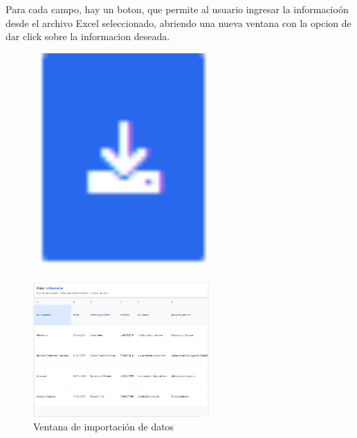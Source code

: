 \documentclass{Pretexto/bluereport}
\begin{document}
\begin{minipage}{0.68\linewidth}
    Para cada campo, hay un boton, que permite al usuario ingresar la informacioón desde el archivo Excel seleccionado, 
    abriendo una nueva ventana con la opcion de dar click sobre la informacion deseada.
\end{minipage}
\hfil   
\begin{minipage}{0.18\linewidth}
    \begin{figure}[H]
        \centering
        \includegraphics[width=0.6\textwidth]{img/boton_importacion.png}
        \caption{}
        \label{fig:importar_datos}
    \end{figure}
\end{minipage}


\begin{figure}[H]
    \centering
    \includegraphics[width=0.6\textwidth]{img/ventana_importacion.png}
    \caption{Ventana de importación de datos}
    \label{fig:ventana_importacion}
\end{figure}
\end{document}
